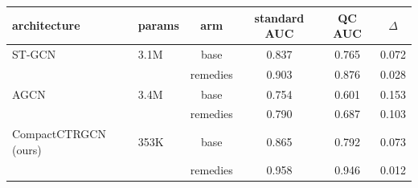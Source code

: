 \begin{tabular}{llcccc}
\toprule
architecture & params & arm & standard AUC & QC AUC & $\Delta$ \\
\midrule
ST-GCN & 3.1M & base & 0.837 & 0.765 & 0.072 \\
 &  & remedies & 0.903 & 0.876 & 0.028 \\
\midrule
AGCN & 3.4M & base & 0.754 & 0.601 & 0.153 \\
 &  & remedies & 0.790 & 0.687 & 0.103 \\
\midrule
CompactCTRGCN (ours) & 353K & base & 0.865 & 0.792 & 0.073 \\
 &  & remedies & 0.958 & 0.946 & 0.012 \\
\bottomrule
\end{tabular}
